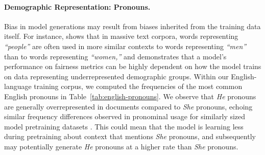 \documentclass{article}
\begin{document}
\paragraph{Demographic Representation: Pronouns.}
Bias in model generations may result from biases inherited from the training data itself. For instance, \citet{bailey2022based} shows that in massive text corpora, words representing \textit{``people''} are often used in more similar contexts to words representing \textit{``men''} than to words representing \textit{``women,''} and \citet{ganesh2023impact} demonstrates that a model's performance on fairness metrics can be highly dependent on how the model trains on data representing underrepresented demographic groups. Within our English-language training corpus, we computed the frequencies of the most common English pronouns in Table~\ref{tab:english-pronouns}.
We observe that \textit{He} pronouns are generally overrepresented in documents compared to \textit{She} pronouns, echoing similar frequency differences observed in pronominal usage for similarly sized model pretraining datasets \citep{palm1}.
This could mean that the model is learning less during pretraining about context that mentions \textit{She} pronouns, and subsequently may potentially generate \textit{He} pronouns at a higher rate than \textit{She} pronouns.
\end{document}
